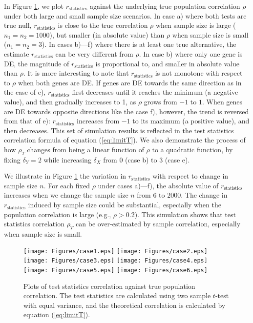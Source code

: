 	In Figure \ref{fig:tstat}, we plot $r_\text{statistics}$ against the 
	underlying true population correlation $\rho$ under both large and small sample size scenarios. 
	In case a) where both tests are true null, $r_\text{statistics}$ is close to the true 
	correlation $\rho$ when sample size is large ($n_1 = n_2 = 1000$), but smaller (in absolute 
	value) than $\rho$ when sample size is small ($n_1 = n_2 = 3$).
	In cases b)---f) where there is at least one true alternative, the estimate
	$r_\text{statistics}$ can be very 
	different from $\rho$. In case b) where only one gene is DE, 
	the magnitude of $r_\text{statistics}$ is proportional to, and smaller in absolute value than 
	$\rho$.
	It is more interesting to note that $r_\text{statistics}$ is not monotone with respect to 
	$\rho$ when both genes are DE. If genes are DE towards the same direction as in the case of 
	e),  $r_\text{statistics}$ first decreases until it reaches the minimum (a negative value), and 
	then gradually increases to 1, as 
	$\rho$ grows from $-1$ to $1$. When genes are DE towards opposite directions like the case f), 
	however, the trend is reversed from that of e): $r_\text{statistics}$ increases from $-1$ to 
	its maximum (a positive value), and then decreases. 
	This set of simulation results is reflected in the test statistics correlation formula of 
	equation (\ref{eq:limitT}). We also demonstrate the process of how $\rho_T$ changes from
	being a linear function of $\rho$ to a quadratic function, by fixing $\delta_Y=2$ while 
	increasing $\delta_X$ from $0$ (case b) to $3$ (case e).
	
	We illustrate in Figure \ref{fig:tstat} the variation in $r_\text{statistics}$ with 
	respect to change in sample size $n$. For each fixed $\rho$ under cases a)---f), the absolute 
	value of $r_\text{statistics}$  increases when we change the sample size $n$ from $6$ to 
	$2000$. The change in $r_\text{statistics}$ induced by sample size could be substantial, 
	especially when the population correlation is large (e.g., $\rho > 0.2$). This simulation shows 
	that test statistics correlation $\rho_T$ can be over-estimated by sample correlation, 
	especially when sample size is small.
	
	\begin{figure}[!th]
		\centering
		\texttt{[image: Figures/case1.eps]}
		\texttt{[image: Figures/case2.eps]}
		\texttt{[image: Figures/case3.eps]}
		\texttt{[image: Figures/case4.eps]}
		\texttt{[image: Figures/case5.eps]}
		\texttt{[image: Figures/case6.eps]}
		\caption{Plots of test statistics correlation against true population 
			correlation. The test statistics are calculated 
			using two sample $t$-test with equal variance, and the theoretical correlation is 
			calculated by 
			equation (\ref{eq:limitT}).}
		\label{fig:tstat}
	\end{figure}
	
